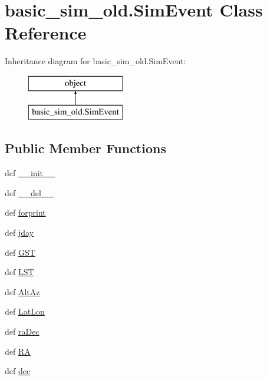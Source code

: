\hypertarget{classbasic__sim__old_1_1_sim_event}{\section{basic\-\_\-sim\-\_\-old.\-Sim\-Event Class Reference}
\label{classbasic__sim__old_1_1_sim_event}
}
Inheritance diagram for basic\-\_\-sim\-\_\-old.\-Sim\-Event\-:\begin{figure}[H]
\begin{center}
\leavevmode
\includegraphics[height=2.000000cm]{de/d77/classbasic__sim__old_1_1_sim_event}
\end{center}
\end{figure}
\subsection*{Public Member Functions}
\begin{DoxyCompactItemize}
\item 
def \hyperlink{classbasic__sim__old_1_1_sim_event_aaef4bb94745ed59caf2fa4e59aa2b6e7}{\-\_\-\-\_\-init\-\_\-\-\_\-}
\item 
def \hyperlink{classbasic__sim__old_1_1_sim_event_a02262a28ffb04370abf5968353798354}{\-\_\-\-\_\-del\-\_\-\-\_\-}
\item 
def \hyperlink{classbasic__sim__old_1_1_sim_event_a0e06cb1a31ac729d90b219864a1d327f}{forprint}
\item 
def \hyperlink{classbasic__sim__old_1_1_sim_event_ab455dcbf5fd02e68e8f1b670195c161c}{jday}
\item 
def \hyperlink{classbasic__sim__old_1_1_sim_event_ad59c9f8114aa2f50b7d7301204ca7bbc}{G\-S\-T}
\item 
def \hyperlink{classbasic__sim__old_1_1_sim_event_a5b9ea8c6d9ce5a40a28a3a8eee6a3674}{L\-S\-T}
\item 
def \hyperlink{classbasic__sim__old_1_1_sim_event_ad889b1c098f4b32899232212c551dc3f}{Alt\-Az}
\item 
def \hyperlink{classbasic__sim__old_1_1_sim_event_ac4a235942421c942a7824956d86d0276}{Lat\-Lon}
\item 
def \hyperlink{classbasic__sim__old_1_1_sim_event_a9fa90508863fcdd824388fdfbfd167b0}{ra\-Dec}
\item 
def \hyperlink{classbasic__sim__old_1_1_sim_event_ab3768f5029c64a2361813ad845df2f57}{R\-A}
\item 
def \hyperlink{classbasic__sim__old_1_1_sim_event_a1613d4a9fc11172d53dcfed4a37278af}{dec}
\end{DoxyCompactItemize}
